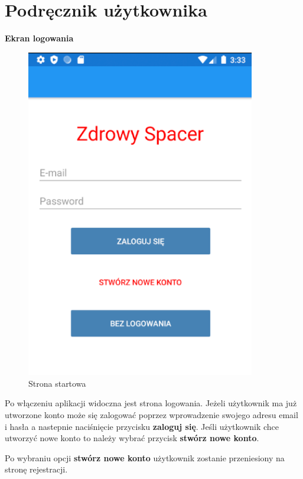 	\newpage
\section{Podręcznik użytkownika}  %
\textbf{Ekran logowania}

\begin{figure}[!htb]
	\begin{center}
		\includegraphics[width=10cm]{rys/login.png}
		\caption{Strona startowa}
		\label{rys:rysunek029}
	\end{center}
\end{figure}
 
Po włączeniu aplikacji widoczna jest strona logowania. Jeżeli użytkownik ma już utworzone konto może się zalogować poprzez wprowadzenie swojego adresu email i hasła a nastepnie naciśnięcie przycisku \textbf{zaloguj się}. Jeśli użytkownik chce utworzyć nowe konto to należy wybrać przycisk \textbf{stwórz nowe konto}. \newline

Po wybraniu opcji \textbf{stwórz nowe konto} użytkownik zostanie przeniesiony na stronę rejestracji. \newline \newline


